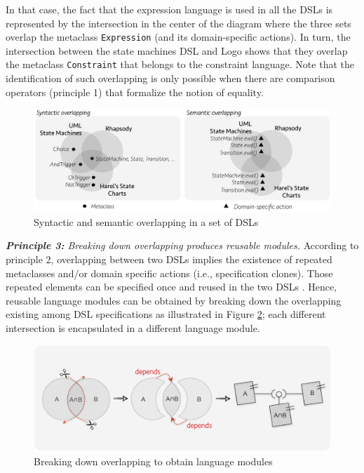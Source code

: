 In that case, the fact that the expression language is used in all the DSLs is represented by the intersection in the center of the diagram where the three sets overlap the metaclass \texttt{Expression} (and its domain-specific actions). In turn, the intersection between the state machines DSL and Logo shows that they overlap the metaclass \texttt{Constraint} that belongs to the constraint language. Note that the identification of such overlapping is only possible when there are comparison operators (principle 1) that formalize the notion of equality.  

\begin{figure}
\centering
\includegraphics[width=1\linewidth]{images/fig-overlapping.png}
\caption{Syntactic and semantic overlapping in a set of DSLs}
\label{fig:shape}
\end{figure}

\vspace{2mm}
\textit{\textbf{Principle 3:} Breaking down overlapping produces reusable modules.} According to principle 2, overlapping between two DSLs implies the existence of repeated metaclasses and/or domain specific actions (i.e., specification clones). Those repeated elements can be specified once and reused in the two DSLs \cite[p. 60-61]{Voelter:2013b}. Hence, reusable language modules can be obtained by breaking down the overlapping existing among DSL specifications as illustrated in Figure \ref{fig:cutting}; each different intersection is encapsulated in a different language module. 

\begin{figure}
\centering
\includegraphics[width=0.97\linewidth]{images/fig-breaking-overlapping.png}
\caption{Breaking down overlapping to obtain language modules}
\label{fig:cutting}
\end{figure}

